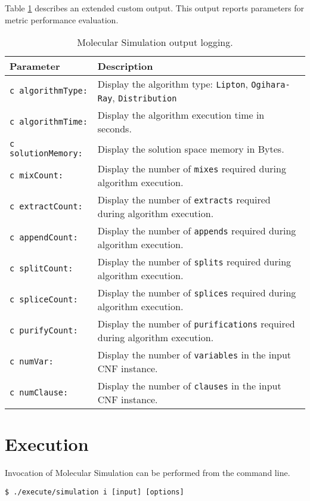 Table \ref{outputTableDefiniton} describes an extended custom output.  This output reports parameters for metric performance evaluation.
\begin{table}[htdp]
\caption{Molecular Simulation output logging.}
\begin{center}
\begin{tabular}{| l | l |}
\hline
\textbf{Parameter} & \textbf{Description} \\ \hline	
\texttt{c algorithmType:}&	Display the algorithm type: \texttt{Lipton}, \texttt{Ogihara-Ray}, \texttt{Distribution}\\ 
\texttt{c algorithmTime:}&	Display the algorithm execution time in seconds.\\ 
\texttt{c solutionMemory:}& Display the solution space memory in Bytes.	\\ 
\texttt{c mixCount:}	&	Display the number of \texttt{mixes} required during algorithm execution.\\ 
\texttt{c extractCount:}&	Display the number of \texttt{extracts} required during algorithm execution.\\ 
\texttt{c appendCount:}&	Display the number of \texttt{appends} required during algorithm execution.\\ 
\texttt{c splitCount:}	&	Display the number of \texttt{splits} required during algorithm execution.\\ 
\texttt{c spliceCount:}&	Display the number of \texttt{splices} required during algorithm execution.\\ 
\texttt{c purifyCount:}&	Display the number of \texttt{purifications} required during algorithm execution.\\ 
\texttt{c numVar:}	&	Display the number of \texttt{variables} in the input CNF instance.\\ 
\texttt{c numClause:}	&	Display the number of \texttt{clauses} in the input CNF instance.\\ \hline

\end{tabular}
\end{center}
\label{outputTableDefiniton}
\end{table}%
		
\FloatBarrier
			
\section{Execution}
Invocation of Molecular Simulation can be performed from the command line.
	\begin{center}
	\texttt{\$ ./execute/simulation i [input] [options]}
	\end{center}

